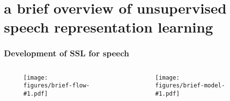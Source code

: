 
\section{a brief overview of unsupervised speech representation learning}



\newcommand{\presentationbriefslide}[3]{%
    \begin{frame}
        \frametitle{#2}
        \begin{columns}[t]

            \hspace{0.025\textwidth}

            \begin{column}{0.20\textwidth}
                \begin{figure}
                    \centering
                    \texttt{[image: figures/brief-flow-\#1.pdf]}
                \end{figure}
            \end{column}


            \begin{column}{0.4\textwidth}
                \vspace{0.1\textheight}
                {#3}
            \end{column}

            \begin{column}{0.35\textwidth}
                \begin{figure}
                    \centering
                    \texttt{[image: figures/brief-model-\#1.pdf]}
                \end{figure}
            \end{column}

            \hspace{0.025\textwidth}

        \end{columns}
    \end{frame}
}


\presentationbriefslide{1}{Development of SSL for speech}{}

